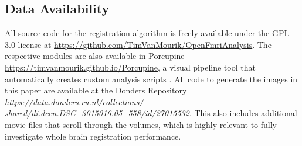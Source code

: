 \subsection{Data Availability}
All source code for the registration algorithm is freely available under the GPL 3.0 license at \url{https://github.com/TimVanMourik/OpenFmriAnalysis}. The respective modules are also available in Porcupine \url{https://timvanmourik.github.io/Porcupine}, a visual pipeline tool that automatically creates custom analysis scripts \cite{VanMourik2017}. All code to generate the images in this paper are available at the Donders Repository \textit{https://data.donders.ru.nl/collections/} \\ \textit{shared/di.dccn.DSC\_3015016.05\_558/id/27015532}. This also includes additional movie files that scroll through the volumes, which is highly relevant to fully investigate whole brain registration performance. 



